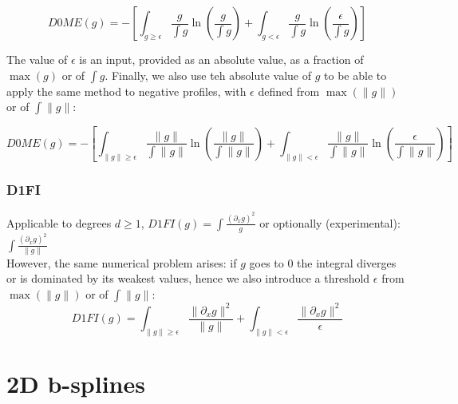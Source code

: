 \documentclass[paper=a4, fontsize=11pt]{book}
\numberwithin{equation}{section}		%
\numberwithin{figure}{section}			%
\numberwithin{table}{section}				%
\begin{document}
$$
D0ME\left(g\right) = - \left[\int_{g\geq \epsilon} \frac{g}{\int g}\ln\left(\frac{g}{\int g}\right) + \int_{g<\epsilon} \frac{g}{\int g}\ln\left(\frac{\epsilon}{\int g}\right) \right]
$$

The value of $\epsilon$ is an input, provided as an absolute value, as a fraction of $\max(g)$ or of $\int g$.
Finally, we also use teh absolute value of $g$ to be able to apply the same method to negative profiles, with $\epsilon$ defined from $\max(\|g\|)$ or of $\int \|g\|$:

$$
D0ME\left(g\right) = - \left[\int_{\|g\|\geq \epsilon} \frac{\|g\|}{\int \|g\|}\ln\left(\frac{\|g\|}{\int \|g\|}\right) + \int_{\|g\|<\epsilon} \frac{\|g\|}{\int \|g\|}\ln\left(\frac{\epsilon}{\int \|g\|}\right) \right]
$$


\subsubsection{D1FI}

Applicable to degrees $d \geq 1$, $D1FI\left(g\right) = \int \frac{\left(\partial_x g\right)^2}{g}$ or optionally (experimental): $\int \frac{\left(\partial_x g\right)^2}{\|g\|}$\\
However, the same numerical problem arises: if $g$ goes to $0$ the integral diverges or is dominated by its weakest values, hence we also introduce a threshold $\epsilon$ from $\max(\|g\|)$ or of $\int \|g\|$:
$$
D1FI\left(g\right) = \int_{\|g\|\geq \epsilon} \frac{\|\partial_x g\|^2}{\|g\|} + \int_{\|g\|<\epsilon} \frac{\|\partial_x g\|^2}{\epsilon}
$$




\newpage
\section{2D b-splines}
\end{document}

